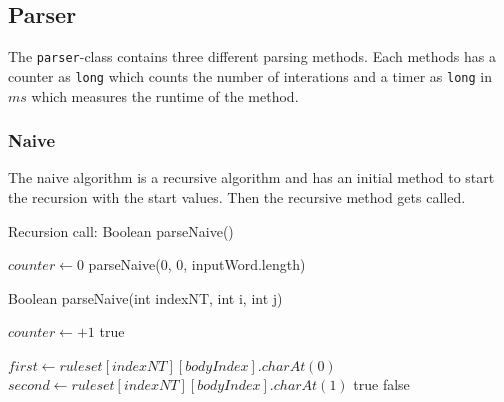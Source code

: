 \documentclass[a4paper, 11pt]{article}
\begin{document}

\subsection{Parser}
\label{parser}

The \texttt{parser}-class contains three different parsing methods. Each methods has a counter as \texttt{long} which counts the number of interations and a timer as \texttt{long} in $ms$ which measures the runtime of the method.


\subsubsection{Naive}
\label{naive}

The naive algorithm is a recursive algorithm and has an initial method to start the recursion with the start values. Then the recursive method gets called.

\begin{algorithm}
\caption{Recursion call: Boolean parseNaive()}\label{alg:cap}
\begin{algorithmic}[1]
\State $counter \gets 0$
\State \Return parseNaive(0, 0, inputWord.length)
\end{algorithmic}
\end{algorithm}


\begin{algorithm}
\caption{Boolean parseNaive(int indexNT, int i, int j)}\label{alg:cap}
\begin{algorithmic}[1]
\State $counter \gets +1$
\State \Return true
\EndIf
\EndFor

\Else
{}
\State $first \gets ruleset[indexNT][bodyIndex].charAt(0)$
\State $second \gets ruleset[indexNT][bodyIndex].charAt(1)$
\State \Return true
\EndIf
\EndFor
\EndIf
\EndFor
\EndIf
\State \Return false
\end{algorithmic}
\end{algorithm}
\end{document}
